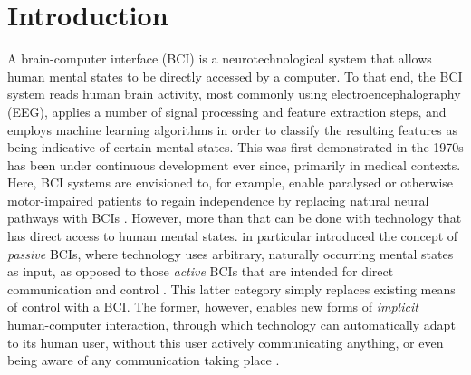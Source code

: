 \documentclass[a4paper]{article}
\begin{document}
\title{}
\date{}

\author[1,*]{Laurens R. Krol}
\author[2]{Thorsten O. Zander}


\maketitle

\begin{abstract}

\end{abstract}


\section{Introduction}

A brain-computer interface (BCI) is a neurotechnological system that allows human mental states to be directly accessed by a computer. To that end, the BCI system reads human brain activity, most commonly using electroencephalography (EEG), applies a number of signal processing and feature extraction steps, and employs machine learning algorithms in order to classify the resulting features as being indicative of certain mental states. This was first demonstrated in the 1970s \cite{vidal1977realtimedetect} has been under continuous development ever since, primarily in medical contexts. Here, BCI systems are envisioned to, for example, enable paralysed or otherwise motor-impaired patients to regain independence by replacing natural neural pathways with BCIs \cite{wolpaw2002commcontrol}. However, more than that can be done with technology that has direct access to human mental states.  in particular introduced the concept of \emph{passive} BCIs, where technology uses arbitrary, naturally occurring mental states as input, as opposed to those \emph{active} BCIs that are intended for direct communication and control \cite{krol2018interactivity}. This latter category simply replaces existing means of control with a BCI. The former, however, enables new forms of \emph{implicit} human-computer interaction, through which technology can automatically adapt to its human user, without this user actively communicating anything, or even being aware of any communication taking place \cite{krol2022definingnat}.
\end{document}
